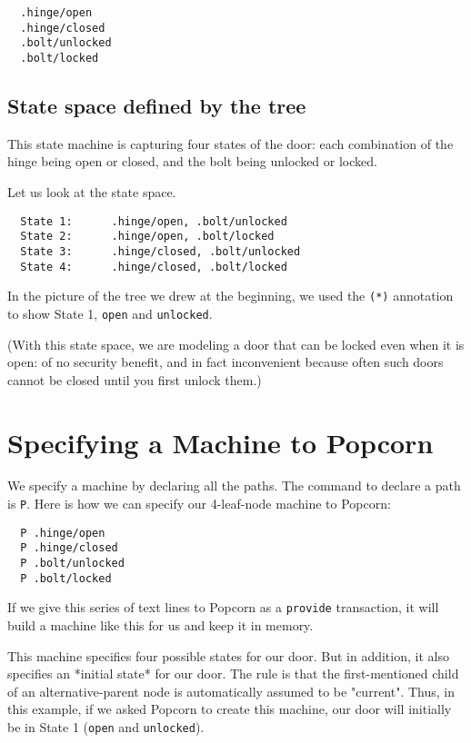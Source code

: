 \documentclass[12pt]{article}
\begin{document}
\begin{verbatim}
  .hinge/open
  .hinge/closed
  .bolt/unlocked
  .bolt/locked
\end{verbatim}

\subsection{State space defined by the tree}

This state machine is capturing four states of the door: each
combination of the hinge being open or closed, and the bolt being
unlocked or locked.

Let us look at the state space.

\begin{verbatim}
  State 1:      .hinge/open, .bolt/unlocked
  State 2:      .hinge/open, .bolt/locked
  State 3:      .hinge/closed, .bolt/unlocked
  State 4:      .hinge/closed, .bolt/locked

\end{verbatim}

In the picture of the tree we drew at the beginning, we used the \verb`(*)`
annotation to show State 1, \verb`open` and \verb`unlocked`.

(With this state space, we are modeling a door that can be locked even
when it is open: of no security benefit, and in fact inconvenient
because often such doors cannot be closed until you first unlock
them.)

\section{Specifying a Machine to Popcorn}

We specify a machine by declaring all the paths. The command to
declare a path is \verb`P`. Here is how we can specify our 4-leaf-node
machine to Popcorn:

\begin{verbatim}
  P .hinge/open
  P .hinge/closed
  P .bolt/unlocked
  P .bolt/locked
\end{verbatim}

If we give this series of text lines to Popcorn as a \verb`provide`
transaction, it will build a machine like this for us and keep it in
memory.

This machine specifies four possible states for our door. But in
addition, it also specifies an *initial state* for our door. The rule
is that the first-mentioned child of an alternative-parent node is
automatically assumed to be "current". Thus, in this example, if we
asked Popcorn to create this machine, our door will initially be in
State 1 (\verb`open` and \verb`unlocked`).
\end{document}
